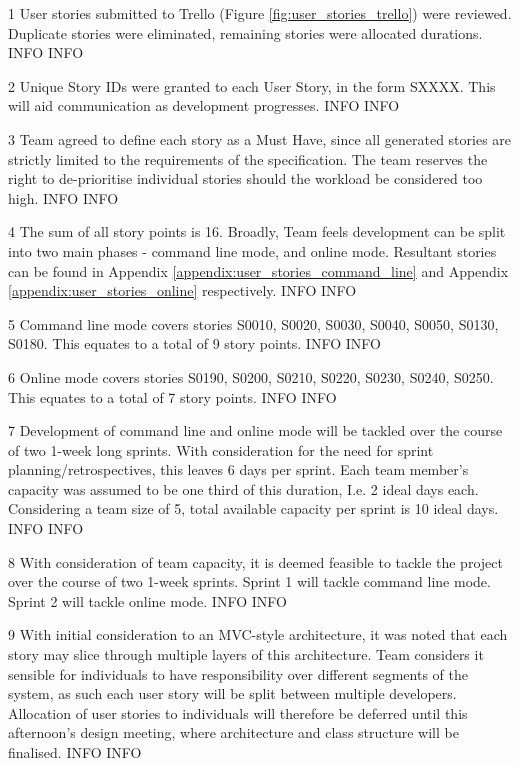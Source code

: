 \begin{momitems}
	\momitem
	{1}
	{User stories submitted to Trello (Figure \ref{fig:user_stories_trello}) were reviewed.
	Duplicate stories were eliminated, remaining stories were allocated durations.}
	{INFO}
	{INFO}
	
	\momitem
	{2}
	{Unique Story IDs were granted to each User Story, in the form SXXXX. 
	This will aid communication as development progresses.}
	{INFO}
	{INFO}

	\momitem
	{3}
	{Team agreed to define each story as a Must Have, since all generated stories are strictly limited to the requirements of the specification. 
	The team reserves the right to de-prioritise individual stories should the workload be considered too high.}
	{INFO}
	{INFO}

	\momitem
	{4}
	{The sum of all story points is 16. Broadly, Team feels development can be split into two main phases - command line mode, and online mode. 
	Resultant stories can be found in Appendix \ref{appendix:user_stories_command_line} and Appendix \ref{appendix:user_stories_online} respectively.}
	{INFO}
	{INFO}

	\momitem
	{5}
	{Command line mode covers stories S0010, S0020, S0030, S0040, S0050, S0130, S0180. 
	This equates to a total of 9 story points.}
	{INFO}
	{INFO}

	\momitem
	{6}
	{Online mode covers stories S0190, S0200, S0210, S0220, S0230, S0240, S0250. 
	This equates to a total of 7 story points.}
	{INFO}
	{INFO}

	\momitem
	{7}
	{Development of command line and online mode will be tackled over the course of two 1-week long sprints. 
	With consideration for the need for sprint planning/retrospectives, this leaves 6 days per sprint. 
	Each team member's capacity was assumed to be one third of this duration, I.e. 2 ideal days each. 
	Considering a team size of 5, total available capacity per sprint is 10 ideal days.}
	{INFO}
	{INFO}

	\momitem
	{8}
	{With consideration of team capacity, it is deemed feasible to tackle the project over the course of two 1-week sprints. 
	Sprint 1 will tackle command line mode. 
	Sprint 2 will tackle online mode.}
	{INFO}
	{INFO}

	\momitem
	{9}
	{With initial consideration to an MVC-style architecture, it was noted that each story may slice through multiple layers of this architecture.
	Team considers it sensible for individuals to have responsibility over different segments of the system, as such each user story will be split between multiple developers. 
	Allocation of user stories to individuals will therefore be deferred until this afternoon's design meeting, where architecture and class structure will be finalised.}
	{INFO}
	{INFO}


\end{momitems}
